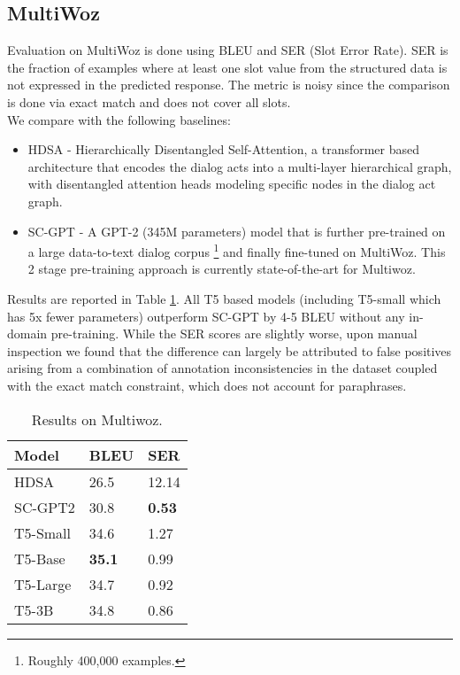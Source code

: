 \documentclass[11pt,a4paper]{article}
\begin{document}
\subsection{MultiWoz}
Evaluation on MultiWoz is done using BLEU and SER (Slot Error Rate). SER is the fraction of examples where at least one slot value from the structured data is not expressed in the predicted response. The metric is noisy since the comparison is done via exact match and does not cover all slots. \\
We compare with the following baselines:
\begin{itemize}
    \item HDSA \cite{chen2019semantically} - Hierarchically Disentangled Self-Attention, a transformer based architecture that encodes the dialog acts into a multi-layer hierarchical graph, with disentangled attention heads modeling specific nodes in the dialog act graph.
    \item SC-GPT \cite{peng2020few} - A GPT-2 (345M parameters) model that is further pre-trained on a large data-to-text dialog corpus \footnote{Roughly 400,000 examples.} and finally fine-tuned on MultiWoz. This 2 stage pre-training approach is currently state-of-the-art for Multiwoz.
\end{itemize}
\par Results are reported in Table \ref{results-multiwoz}. All T5 based models (including T5-small which has 5x fewer parameters) outperform SC-GPT by 4-5 BLEU without any in-domain pre-training. While the SER scores are slightly worse, upon manual inspection we found that the difference can largely be attributed to false positives arising from a combination of annotation inconsistencies in the dataset coupled with the exact match constraint, which does not account for paraphrases.  



\begin{table}[]
\centering
\begin{tabular}{lll} \hline
Model    & BLEU                         & SER                         \\ \hline
HDSA     & 26.5                        & 12.14                       \\
SC-GPT2  & 30.8                        & \textbf{0.53}                        \\
T5-Small & 34.6  & 1.27 \\
T5-Base  & \textbf{35.1} & 0.99 \\
T5-Large & 34.7 & 0.92 \\
T5-3B    & 34.8 & 0.86 \\ \hline
\end{tabular}
\caption{Results on Multiwoz.}
\label{results-multiwoz}
\end{table}
\end{document}
